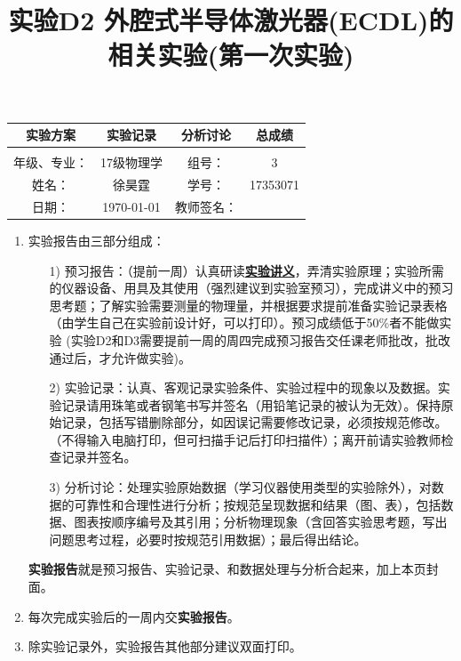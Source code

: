 \documentclass[10pt,a4paper]{ctexart}
\title{实验D2 外腔式半导体激光器(ECDL)的相关实验(第一次实验)}
\date{}
\begin{document}
\maketitle
\begin{center}
\begin{tabular}{|c|c|c|c|}
\hline
		实验方案 &实验记录  &分析讨论 &总成绩\\
		\hline
		        &          &          &  \\
	    \hline
	\hline 
	年级、专业： &17级物理学 &组号：& 3 \\
	\hline
	姓名：& 徐昊霆 &学号：&17353071  \\
	\hline
	日期：& \today &教师签名： &  \\
    \hline	
\end{tabular}
\end{center}
    \begin{enumerate}
 \item 实验报告由三部分组成：
 \begin{enumerate}
  \item[1)]预习报告：（提前一周）认真研读\textbf{\uline{实验讲义}}，弄清实验原理；实验所需的仪器设备、用具及其使用（强烈建议到实验室预习），完成讲义中的预习思考题；了解实验需要测量的物理量，并根据要求提前准备实验记录表格（由学生自己在实验前设计好，可以打印）。预习成绩低于50\%者不能做实验{\color{red} (实验D2和D3需要提前一周的周四完成预习报告交任课老师批改，批改通过后，才允许做实验)}。

  \item[2)]实验记录：认真、客观记录实验条件、实验过程中的现象以及数据。实验记录请用珠笔或者钢笔书写并签名（{\color{red}用铅笔记录的被认为无效}）。{\color{red}保持原始记录，包括写错删除部分，如因误记需要修改记录，必须按规范修改。}（不得输入电脑打印，但可扫描手记后打印扫描件）；离开前请实验教师检查记录并签名。
  \item[3)]分析讨论：处理实验原始数据（学习仪器使用类型的实验除外），对数据的可靠性和合理性进行分析；按规范呈现数据和结果（图、表），包括数据、图表按顺序编号及其引用；分析物理现象（含回答实验思考题，写出问题思考过程，必要时按规范引用数据）；最后得出结论。
 \end{enumerate}
 \textbf{实验报告}就是预习报告、实验记录、和数据处理与分析合起来，加上本页封面。
 \item 每次完成实验后的一周内交\textbf{实验报告}。
 \item 除实验记录外，实验报告其他部分建议双面打印。
\end{enumerate}

    
\newpage
\tableofcontents
\newpage
\end{document}
